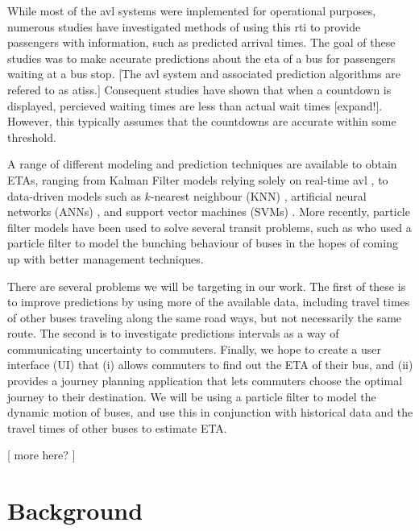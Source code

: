 \documentclass[12pt,a4paper]{article}
\begin{document}
While most of the \gls{avl} systems were implemented for operational purposes,
numerous studies have investigated methods of using this \gls{rti} 
to provide passengers with information, such as predicted arrival times.
The goal of these studies was to make accurate predictions about the \gls{eta}
of a bus for passengers waiting at a bus stop.
[The \gls{avl} system and associated prediction algorithms are refered to as \glspl{atis}.]
Consequent studies have shown that when a countdown is displayed, percieved waiting times are less 
than actual wait times \citep{tcrp:2003} [expand!].
However, this typically assumes that the countdowns are accurate within some threshold.


A range of different modeling and prediction techniques are available to obtain ETAs,
ranging from Kalman Filter models relying solely on real-time \gls{avl} \citep{cn}, 
to data-driven models such as 
$k$-nearest neighbour (KNN) \citep{cn}, 
artificial neural networks (ANNs) \citep{cn}, 
and support vector machines (SVMs) \citep{cn}.
More recently, particle filter models have been used to solve several transit problems,
such as \cite{hans-etal:2015} who used a particle filter to model the bunching behaviour of buses
in the hopes of coming up with better management techniques.


There are several problems we will be targeting in our work.
The first of these is to improve predictions by using more of the available data,
including travel times of other buses traveling along the same road ways, 
but not necessarily the same route.
The second is to investigate predictions intervals as a way of communicating uncertainty to commuters.
Finally, we hope to create a user interface (UI) that (i) allows commuters to find out the ETA of their bus,
and (ii) provides a journey planning application that lets commuters choose the optimal journey to their destination.
We will be using a particle filter to model the dynamic motion of buses,
and use this in conjunction with historical data and the travel times of other buses to estimate ETA.


[ more here? ]


\section{Background}
\label{sec:background}


\end{document}
